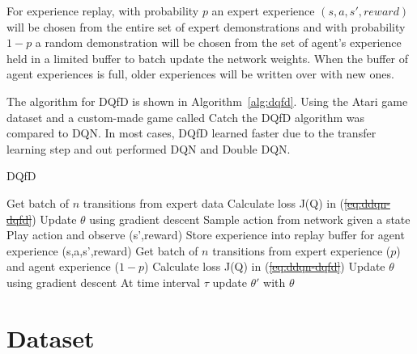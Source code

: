 \documentclass[12pt,american]{report}
\providecommand{\DIFaddtex}[1]{{\protect\color{blue}\uwave{#1}}} %
\providecommand{\DIFdeltex}[1]{{\protect\color{red}\sout{#1}}}                      %
\providecommand{\DIFaddbegin}{} %
\providecommand{\DIFaddend}{} %
\providecommand{\DIFdelbegin}{} %
\providecommand{\DIFdelend}{} %
\providecommand{\DIFadd}[1]{\texorpdfstring{\DIFaddtex{#1}}{#1}} %
\providecommand{\DIFdel}[1]{\texorpdfstring{\DIFdeltex{#1}}{}} %
\newcommand{\DIFscaledelfig}{0.5}
\newlength{\DIFdelgraphicswidth} %
\newlength{\DIFdelgraphicsheight} %
\newcommand{\DIFaddincludegraphics}[2][]{{\color{blue}\fbox{\DIFOincludegraphics[#1]{#2}}}} %
\newcommand{\DIFdelincludegraphics}[2][]{%
\sbox{\DIFdelgraphicsbox}{\DIFOincludegraphics[#1]{#2}}%
\settoboxwidth{\DIFdelgraphicswidth}{\DIFdelgraphicsbox} %
\settoboxtotalheight{\DIFdelgraphicsheight}{\DIFdelgraphicsbox} %
\scalebox{\DIFscaledelfig}{%
\parbox[b]{\DIFdelgraphicswidth}{\usebox{\DIFdelgraphicsbox}\\[-\baselineskip] \rule{\DIFdelgraphicswidth}{0em}}\llap{\resizebox{\DIFdelgraphicswidth}{\DIFdelgraphicsheight}{%
\setlength{\unitlength}{\DIFdelgraphicswidth}%
\begin{picture}(1,1)%
\thicklines\linethickness{2pt} %
{\color[rgb]{1,0,0}\put(0,0){\framebox(1,1){}}}%
{\color[rgb]{1,0,0}\put(0,0){\line( 1,1){1}}}%
{\color[rgb]{1,0,0}\put(0,1){\line(1,-1){1}}}%
\end{picture}%
}\hspace*{3pt}}} %
} %
\DeclareRobustCommand{\DIFaddbegin}{\DIFOaddbegin \let\includegraphics\DIFaddincludegraphics} %
\DeclareRobustCommand{\DIFaddend}{\DIFOaddend \let\includegraphics\DIFOincludegraphics} %
\DeclareRobustCommand{\DIFdelbegin}{\DIFOdelbegin \let\includegraphics\DIFdelincludegraphics} %
\DeclareRobustCommand{\DIFdelend}{\DIFOaddend \let\includegraphics\DIFOincludegraphics} %
\begin{document}
For experience replay, with probability $p$ an expert experience $(s,a,s',reward)$ will be chosen from the entire set of expert demonstrations and with probability $1-p$ a random demonstration will be chosen from the set of agent's experience held in a limited buffer to batch update the network weights.  When the buffer of agent experiences is full, older experiences will be written over with new ones.  

The algorithm for DQfD is shown in Algorithm~\ref{alg:dqfd}. Using the Atari game dataset and a custom-made game called Catch the DQfD algorithm was compared to DQN.  In most cases, DQfD learned faster due to the transfer learning step and out performed DQN and Double DQN.
\begin{algorithm}
\caption{DQfD}
\label{alg:dqfd}
\begin{algorithmic} 
\State Get batch of $n$ transitions from expert data
\State Calculate loss J(Q) in (\DIFdelbegin \DIFdel{\ref{eq:ddqn-dqfd}}\DIFdelend \DIFaddbegin \DIFadd{\ref{eq:ddqn-dqfd-3}}\DIFaddend )
\State Update $\theta$ using gradient descent
\EndFor
{}
\State Sample action from network given a state
\State Play action and observe (s',reward)
\State Store experience into replay buffer for agent experience (s,a,s',reward)
\State Get batch of $n$ transitions from expert experience ($p$) and agent experience ($1-p$)
\State Calculate loss J(Q) in (\DIFdelbegin \DIFdel{\ref{eq:ddqn-dqfd}}\DIFdelend \DIFaddbegin \DIFadd{\ref{eq:ddqn-dqfd-3}}\DIFaddend )
\State Update $\theta$ using gradient descent
\State At time interval $\tau$ update $\theta'$ with $\theta$
\EndFor
\end{algorithmic}
\end{algorithm}


\chapter{Dataset}
\label{sec:dataset}
\end{document}
